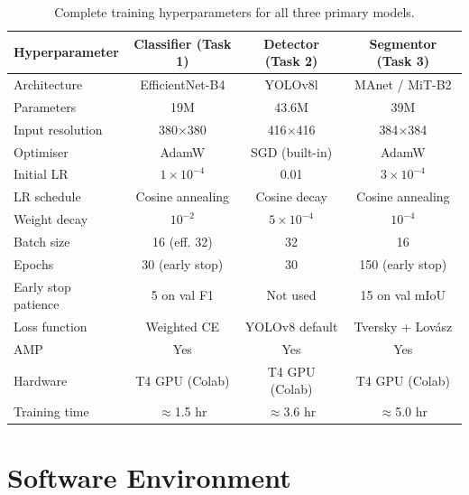 \documentclass[12pt,a4paper]{article}
\begin{document}
\begin{table}[H]
\centering
\caption{Complete training hyperparameters for all three primary models.}
\label{tab:hyperparams}
\begin{tabular}{lccc}
\toprule
\rowcolor{white}
\textbf{Hyperparameter} & \textbf{Classifier (Task 1)} & \textbf{Detector (Task 2)} & \textbf{Segmentor (Task 3)} \\
\midrule
Architecture & EfficientNet-B4 & YOLOv8l & MAnet / MiT-B2 \\
Parameters & 19M & 43.6M & 39M \\
Input resolution & 380$\times$380 & 416$\times$416 & 384$\times$384 \\
Optimiser & AdamW & SGD (built-in) & AdamW \\
Initial LR & $1 \times 10^{-4}$ & 0.01 & $3 \times 10^{-4}$ \\
LR schedule & Cosine annealing & Cosine decay & Cosine annealing \\
Weight decay & $10^{-2}$ & $5 \times 10^{-4}$ & $10^{-4}$ \\
Batch size & 16 (eff. 32) & 32 & 16 \\
Epochs & 30 (early stop) & 30 & 150 (early stop) \\
Early stop patience & 5 on val F1 & Not used & 15 on val mIoU \\
Loss function & Weighted CE & YOLOv8 default & Tversky + Lovász \\
AMP & Yes & Yes & Yes \\
Hardware & T4 GPU (Colab) & T4 GPU (Colab) & T4 GPU (Colab) \\
Training time & $\approx$1.5 hr & $\approx$3.6 hr & $\approx$5.0 hr \\
\bottomrule
\end{tabular}
\end{table}

\section{Software Environment}
\label{app:env}
\end{document}
